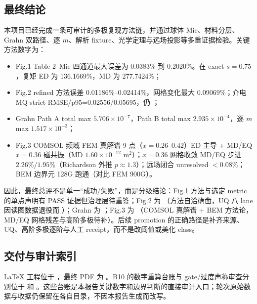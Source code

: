 \subsection{最终结论}

本项目已经完成一条可审计的多极复现方法链，并通过球体 Mie、材料分层、Grahn 双路径、逐 $m$、解析 fixture、光学定理与远场投影等多重证据检验。关键方法数字为：
\begin{itemize}
  \item Fig.1 Table 2--Mie 四通道最大误差为 0.0383\% 到 0.2020\%。在 exact $s=0.75$，复矩 ED 为 136.1669\%，MD 为 277.7424\%；
  \item Fig.2 refined 方法误差 0.01186\%--0.02414\%，网格变化最大 0.09069\%；介电 MQ strict RMSE/p95=0.02556/0.05695，仍 ；
  \item Grahn Path A total max $5.706\times10^{-7}$，Path B total max $2.935\times10^{-4}$，逐 $m$ max $1.517\times10^{-3}$；
  \item Fig.3 COMSOL 频域 FEM 真解谱 9 点（$x=0.26$--$0.42$）ED 主导 + MD/EQ $x=0.36$ 磁共振（MD $1.60\times10^{-12}$ m$^2$）；$x=0.36$ 网格收敛 MD/EQ 步进 $2.26\%/1.95\%$（Richardson 外推 $p\approx1.3$）；远场闭合 unresolved $<0.08\%$；BEM 边界元 128G 跑通（对比 FEM 900G）。
\end{itemize}

因此，最终总评不是单一“成功/失败”，而是分级结论：Fig.1 方法与选定 metric 的单点声明有 PASS 证据但治理层待重签；Fig.2 为 （方法自洽确凿，UQ 八 lane 因读图数据退役而 ）；Grahn 为 ；Fig.3 为 （COMSOL 真解谱 + BEM 方法论，MD/EQ 网格残差与高阶多极待补）。后续 promotion 的正确路径是补齐来源、UQ、高阶多极逐阶与人工 receipt，而不是改阈值或美化 class。

\subsection{交付与审计索引}

LaTeX 工程位于 ，最终 PDF 为 。B10 的数字重算台账与 gate/过度声称审查分别位于  和 。这些台账是本报告关键数字和边界判断的直接审计入口；轮次原始数据与收据仍保留在各自目录，不因本报告生成而改写。
